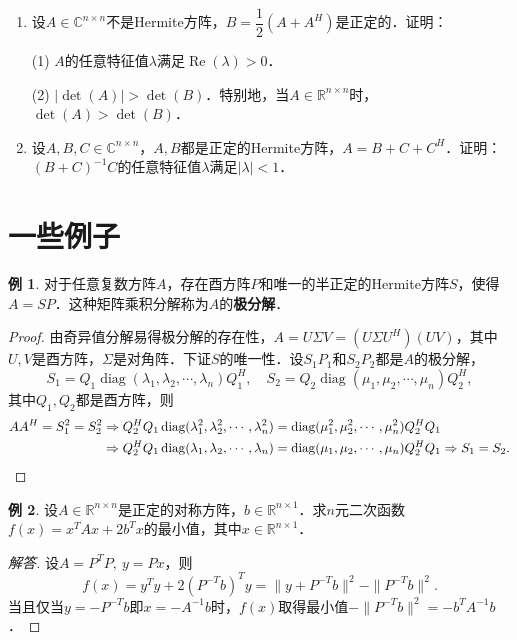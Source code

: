 \documentclass[a4paper,fontset=windows]{ctexbook}
\theoremstyle{definition}
\newtheorem{example}{例}[chapter]
\DeclareMathOperator{\diag}{diag}
\DeclareMathOperator{\re}{Re}
\begin{document}
\begin{enumerate}
\item 设$A\in\mathbb{C}^{n\times n}$不是Hermite方阵，$B=\dfrac{1}{2}(A+A^H)$是正定的．证明：

(1) $A$的任意特征值$\lambda$满足$\re(\lambda)>0$．

(2) $|\det(A)|>\det(B)$．特别地，当$A\in\mathbb{R}^{n\times n}$时，$\det(A)>\det(B)$．

\item 设$A,B,C\in\mathbb{C}^{n\times n}$，$A,B$都是正定的Hermite方阵，$A=B+C+C^H$．证明：$(B+C)^{-1}C$的任意特征值$\lambda$满足$|\lambda|<1$．

\end{enumerate}

\clearpage\section{一些例子}

\begin{example}
对于任意复数方阵$A$，存在酉方阵$P$和唯一的半正定的Hermite方阵$S$，使得$A=SP$．这种矩阵乘积分解称为$A$的{\bf 极分解}．
\end{example}

\begin{proof}
由奇异值分解易得极分解的存在性，$A=U\Sigma V=(U\Sigma U^H)(UV)$，其中$U,V$是酉方阵，$\Sigma$是对角阵．下证$S$的唯一性．设$S_1P_1$和$S_2P_2$都是$A$的极分解，
$$S_1=Q_1\diag(\lambda_1,\lambda_2,\cdots,\lambda_n)Q_1^H,\quad S_2=Q_2\diag(\mu_1,\mu_2,\cdots,\mu_n)Q_2^H,$$
其中$Q_1,Q_2$都是酉方阵，则
\begin{align*}
AA^H=S_1^2=S_2^2&\Rightarrow Q_2^HQ_1\diag(\lambda_1^2,\lambda_2^2,\cdots,\lambda_n^2)=\diag(\mu_1^2,\mu_2^2,\cdots,\mu_n^2)Q_2^HQ_1 \\
&\Rightarrow Q_2^HQ_1\diag(\lambda_1,\lambda_2,\cdots,\lambda_n)=\diag(\mu_1,\mu_2,\cdots,\mu_n)Q_2^HQ_1\Rightarrow S_1=S_2. \qedhere
\end{align*}
\end{proof}

\begin{example}
设$A\in\mathbb{R}^{n\times n}$是正定的对称方阵，$b\in\mathbb{R}^{n\times 1}$．求$n$元二次函数$f(x)=x^TAx+2b^Tx$的最小值，其中$x\in\mathbb{R}^{n\times 1}$．
\end{example}

\begin{proof}[解答]
设$A=P^TP,~y=Px$，则
$$f(x)=y^Ty+2(P^{-T}b)^Ty=\|y+P^{-T}b\|^2-\|P^{-T}b\|^2.$$
当且仅当$y=-P^{-T}b$即$x=-A^{-1}b$时，$f(x)$取得最小值$-\|P^{-T}b\|^2=-b^TA^{-1}b$．
\end{proof}
\end{document}

